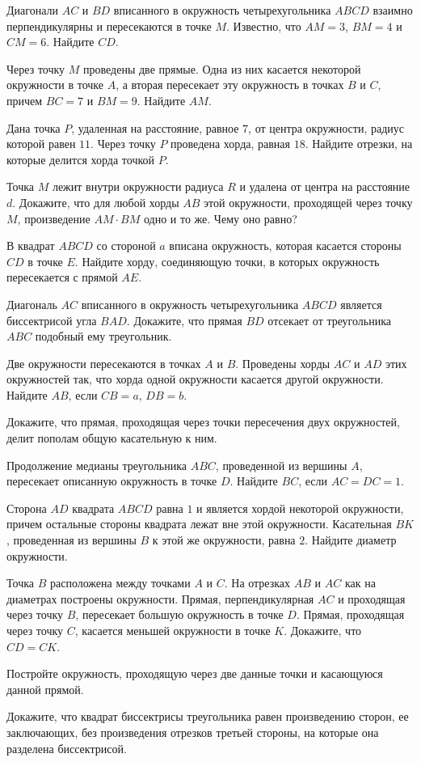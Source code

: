 \begin{tasks}
    \item Диагонали $AC$ и $BD$ вписанного в окружность четырехугольника $ABCD$ взаимно перпендикулярны и пересекаются в точке $M$. Известно, что $AM = 3$, $BM = 4$ и $CM = 6$. Найдите $CD$.
    \item Через точку $M$ проведены две прямые. Одна из них касается некоторой окружности в точке $A$, а вторая пересекает эту окружность в точках $B$ и $C$, причем $BC = 7$ и $BM = 9$. Найдите $AM$.
    \item Дана точка $P$, удаленная на расстояние, равное $7$, от центра окружности, радиус которой равен $11$. Через точку $P$ проведена хорда, равная $18$. Найдите отрезки, на которые делится хорда точкой $P$.
    \item Точка $M$ лежит внутри окружности радиуса $R$ и удалена от центра на расстояние $d$. Докажите, что для любой хорды $AB$ этой окружности, проходящей через точку $M$, произведение $AM \cdot BM$ одно и то же. Чему оно равно?
    \item В квадрат $ABCD$ со стороной $a$ вписана окружность,
которая касается стороны $CD$ в точке $E$. Найдите хорду, соединяющую точки, в которых окружность пересекается с прямой $AE$.
    \item Диагональ $AC$ вписанного в окружность четырехугольника $ABCD$ является биссектрисой угла $BAD$. Докажите, что прямая $BD$ отсекает от треугольника $ABC$ подобный ему треугольник.
    \item Две окружности пересекаются в точках $A$ и $B$. Проведены хорды $AC$ и $AD$ этих окружностей так, что хорда одной окружности касается другой окружности. Найдите $AB$, если $CB = a$, $DB = b$.
    \item Докажите, что прямая, проходящая через точки пересечения двух окружностей, делит пополам общую касательную к ним.
    \item Продолжение медианы треугольника $ABC$, проведенной из вершины $A$, пересекает описанную окружность в точке $D$. Найдите $BC$, если $AC = DC = 1$.
    \item Сторона $AD$ квадрата $ABCD$ равна $1$ и является хордой некоторой окружности, причем остальные стороны квадрата лежат вне этой окружности. Касательная $BK$, проведенная из вершины $B$ к этой же окружности, равна $2$. Найдите диаметр окружности.
    \item Точка $B$ расположена между точками $A$ и $C$. На отрезках $AB$ и $AC$ как на диаметрах построены окружности. Прямая, перпендикулярная $AC$ и проходящая через точку $B$, пересекает большую окружность в точке $D$. Прямая, проходящая через
точку $C$, касается меньшей окружности в точке $K$. Докажите, что $CD = CK$.
    \item Постройте окружность, проходящую через две данные точки и касающуюся данной прямой.
    \item Докажите, что квадрат биссектрисы треугольника равен произведению сторон, ее заключающих, без произведения отрезков третьей стороны, на которые она разделена биссектрисой.
\end{tasks}
